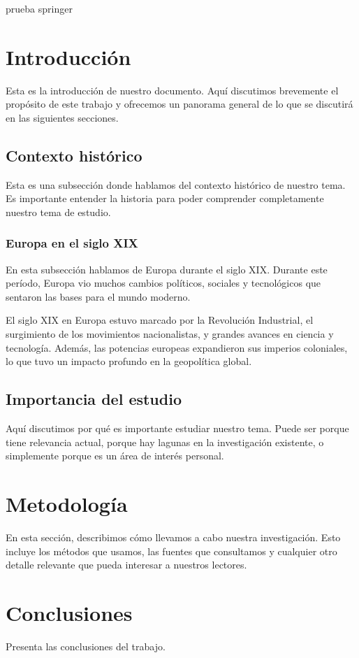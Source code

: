 \documentclass[a4paper,10pt]{article}
\begin{document}
	prueba springer  \cite{cheng2023metaverse}
	
	\section{Introducción}
	Esta es la introducción de nuestro documento. Aquí discutimos brevemente el propósito de este trabajo y ofrecemos un panorama general de lo que se discutirá en las siguientes secciones.
	
	\subsection{Contexto histórico}
	Esta es una subsección donde hablamos del contexto histórico de nuestro tema. Es importante entender la historia para poder comprender completamente nuestro tema de estudio.
	
	\subsubsection{Europa en el siglo XIX}
	En esta subsección hablamos de Europa durante el siglo XIX. Durante este período, Europa vio muchos cambios políticos, sociales y tecnológicos que sentaron las bases para el mundo moderno.
	
	El siglo XIX en Europa estuvo marcado por la Revolución Industrial, el surgimiento de los movimientos nacionalistas, y grandes avances en ciencia y tecnología. Además, las potencias europeas expandieron sus imperios coloniales, lo que tuvo un impacto profundo en la geopolítica global.
	
	\subsection{Importancia del estudio}
	Aquí discutimos por qué es importante estudiar nuestro tema. Puede ser porque tiene relevancia actual, porque hay lagunas en la investigación existente, o simplemente porque es un área de interés personal.
	
	\section{Metodología}
	En esta sección, describimos cómo llevamos a cabo nuestra investigación. Esto incluye los métodos que usamos, las fuentes que consultamos y cualquier otro detalle relevante que pueda interesar a nuestros lectores.
	
	\pagebreak
	\section{Conclusiones}
	Presenta las conclusiones del trabajo.
	\pagebreak
	\printbibliography[heading=bibintoc]
\end{document}
